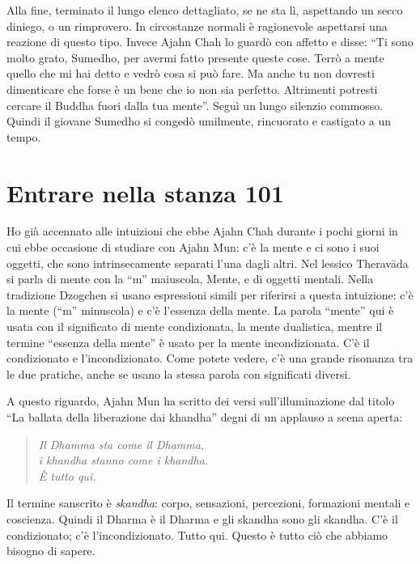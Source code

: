 Alla fine, terminato il lungo elenco dettagliato, se ne sta lì, aspettando un secco diniego, o un rimprovero. In circostanze normali è ragionevole aspettarsi una reazione di questo tipo. Invece Ajahn Chah lo guardò con affetto e disse: ``Ti sono molto grato, Sumedho, per avermi fatto presente queste cose. Terrò a mente quello che mi hai detto e vedrò cosa si può fare. Ma anche tu non dovresti dimenticare che forse è un bene che io non sia perfetto. Altrimenti potresti cercare il Buddha fuori dalla tua mente''. Seguì un lungo silenzio commosso. Quindi il giovane Sumedho si congedò umilmente, rincuorato e castigato a un tempo.

\section*{Entrare nella stanza 101}

Ho già accennato alle intuizioni che ebbe Ajahn Chah durante i pochi giorni in cui ebbe occasione di studiare con Ajahn Mun: c'è la mente e ci sono i suoi oggetti, che sono intrinsecamente separati l'una dagli altri. Nel lessico Theravāda si parla di mente con la ``m'' maiuscola, Mente, e di oggetti mentali. Nella tradizione Dzogchen si usano espressioni simili per riferirsi a questa intuizione: c'è la mente (``m'' minuscola) e c'è l'essenza della mente. La parola ``mente'' qui è usata con il significato di mente condizionata, la mente dualistica, mentre il termine ``essenza della mente'' è usato per la mente incondizionata. C'è il condizionato e l'incondizionato. Come potete vedere, c'è una grande risonanza tra le due pratiche, anche se usano la stessa parola con significati diversi. 

A questo riguardo, Ajahn Mun ha scritto dei versi sull'illuminazione dal titolo ``La ballata della liberazione dai khandha'' degni di un applauso a scena aperta:

\vspace*{-1.2em}
\begin{quote}
\itshape
Il Dhamma sta come il Dhamma, \\
i khandha stanno come i khandha. \\
È tutto qui.
\end{quote}

Il termine sanscrito è \textit{skandha}: corpo, sensazioni, percezioni, formazioni mentali e coscienza. Quindi il Dharma è il Dharma e gli skandha sono gli skandha. C'è il condizionato; c'è l'incondizionato. Tutto qui. Questo è tutto ciò che abbiamo bisogno di sapere. 


